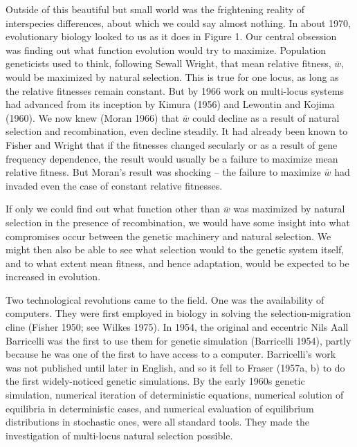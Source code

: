 \documentclass[12pt]{article}
\begin{document}
Outside of this beautiful but small world was the frightening reality of
interspecies differences, about which we could say almost nothing.  In about
1970, evolutionary biology looked to us as it does in Figure 1.
Our central obsession was finding out what function evolution would try to
maximize.  Population geneticists used to think, following Sewall Wright,
that mean relative fitness, $\bar{w}$, would be maximized by natural
selection.  This is true for one locus, as long as the relative fitnesses
remain constant.  But by 1966 work on multi-locus systems had advanced
from its inception by Kimura (1956) and Lewontin and Kojima (1960).
We now knew (Moran 1966) that $\bar{w}$ could decline as a
result of natural selection and recombination, even decline steadily.
It had already been known to Fisher and Wright that if the fitnesses
changed secularly or as a result of gene frequency dependence, the
result would usually be a failure to maximize mean relative fitness.  But
Moran's result was shocking -- the failure to maximize $\bar{w}$ had invaded
even the case of constant relative fitnesses.

If only we could find out what function other than $\bar{w}$ was
maximized by natural selection in the presence of recombination,
we would have some insight into what compromises
occur between the genetic machinery and natural selection.
We might then also be able to see what selection would to the genetic system
itself, and to 
what extent mean fitness, and hence adaptation, would be expected to be
increased in evolution.

Two technological revolutions came to the field.  One was the
availability of computers.  They were first employed in biology in solving
the selection-migration cline (Fisher 1950; see Wilkes 1975).  In 1954,
the original and eccentric Nils Aall Barricelli was the first to use
them for genetic simulation (Barricelli 1954), partly because he was
one of the first to have access to a computer.  Barricelli's work was not
published until later in English, and so it fell to Fraser (1957a, b) to do the
first widely-noticed genetic simulations.  By the early 1960s genetic
simulation, numerical iteration of deterministic equations, numerical
solution of equilibria in deterministic cases, and numerical evaluation
of equilibrium distributions in stochastic ones, were all standard tools.
They made the investigation of multi-locus natural selection possible.
\end{document}
